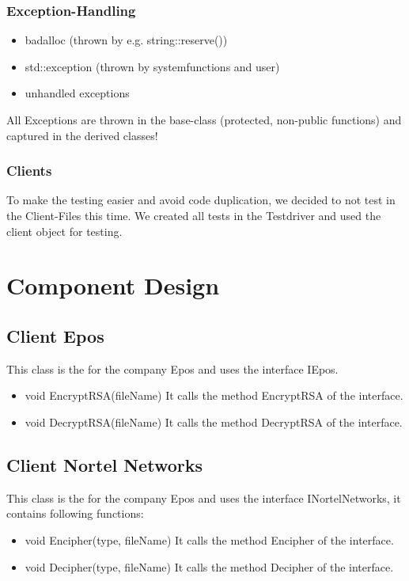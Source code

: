 \subsubsection{Exception-Handling}
\begin{itemize}
	\item badalloc (thrown by e.g. string::reserve())
	\item std::exception (thrown by systemfunctions and user)
	\item unhandled exceptions
\end{itemize}
All Exceptions are thrown in the base-class (protected, non-public functions) and captured in the derived classes!

\subsubsection{Clients}
 To make the testing easier and avoid code duplication, we decided to not test in the Client-Files this time. We created all tests in the Testdriver and used the client object for testing.
	
\section{Component Design}
\subsection{Client Epos}
This class is the for the company Epos and uses the interface IEpos.
\begin{itemize}
\item void EncryptRSA(fileName)
\subitem It calls the method EncryptRSA of the interface.
\item void DecryptRSA(fileName)
\subitem It calls the method DecryptRSA of the interface.
\end{itemize}

\subsection{Client Nortel Networks}
This class is the for the company Epos and uses the interface INortelNetworks, it contains following functions:
\begin{itemize}
\item void Encipher(type, fileName)
\subitem It calls the method Encipher of the interface.
\item void Decipher(type, fileName)
\subitem It calls the method Decipher of the interface.
\end{itemize}

